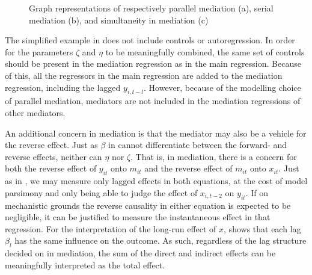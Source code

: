 \begin{figure}[htbp]
\begin{subfigure}[t]{0.32\textwidth}
        \subcaption{}
        \label{fig:methods:mediation_forms:simultaneous}
    \end{subfigure}
    \caption{Graph representations of respectively parallel mediation (a), serial mediation (b), and simultaneity in mediation (c)}
    \label{fig:methods:mediation_forms}
\end{figure}

The simplified example in  does not include controls or autoregression. In order for the parameters $\zeta$ and $\eta$
to be meaningfully combined, the same set of controls should be present in the mediation regression as in the main
regression. Because of this, all the regressors in the main regression are added to the mediation regression, including
the lagged $y_{i,t-l}$. However, because of the modelling choice of parallel mediation, mediators are not included
in the mediation regressions of other mediators.

An additional concern in mediation is that the mediator may also be a vehicle for the reverse effect.
Just as $\beta$ in  cannot differentiate between the forward- and reverse effects,
neither can $\eta$ nor $\zeta$. That is, in mediation, there is a concern for both the reverse effect of $y_{it}$ onto
$m_{it}$ and the reverse effect of $m_{it}$ onto $x_{it}$. Just as in ,
we may measure only lagged effects in both equations, at the cost of model parsimony and only being able to judge the
effect of $x_{i,t-2}$ on $y_{it}$.
If on mechanistic grounds the reverse causality in either equation is expected to be negligible, it can be justified
to measure the instantaneous effect in that regression.
For the interpretation of the long-run effect of $x$,  shows that each lag $\beta_l$
has the same influence on the outcome. As such, regardless of the lag structure decided on in mediation, the sum of the
direct and indirect effects can be meaningfully interpreted as the total effect.

